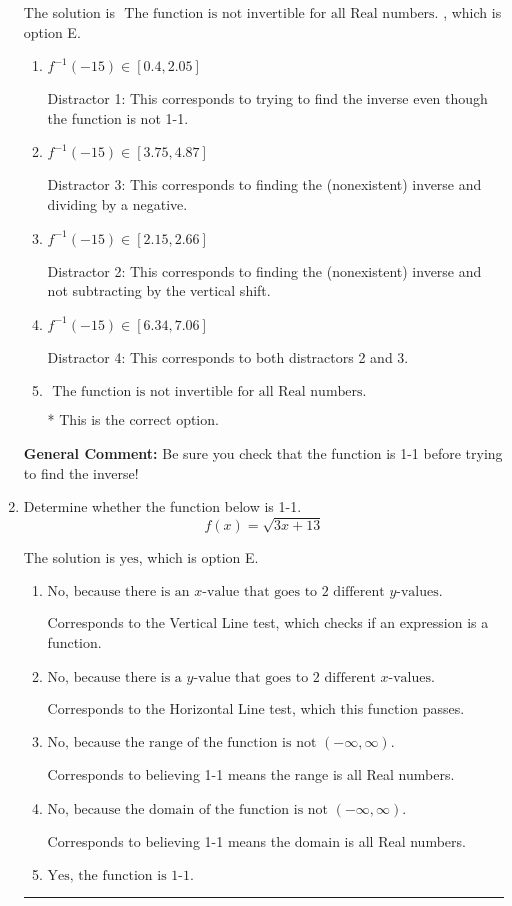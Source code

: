 \documentclass{extbook}[14pt]
\newcommand{\litem}[1]{\item #1

\rule{\textwidth}{0.4pt}}
\begin{document}
\begin{enumerate}
{The solution is \( \text{ The function is not invertible for all Real numbers. } \), which is option E.\begin{enumerate}[label=\Alph*.]
\item \( f^{-1}(-15) \in [0.4, 2.05] \)

 Distractor 1: This corresponds to trying to find the inverse even though the function is not 1-1. 
\item \( f^{-1}(-15) \in [3.75, 4.87] \)

 Distractor 3: This corresponds to finding the (nonexistent) inverse and dividing by a negative.
\item \( f^{-1}(-15) \in [2.15, 2.66] \)

 Distractor 2: This corresponds to finding the (nonexistent) inverse and not subtracting by the vertical shift.
\item \( f^{-1}(-15) \in [6.34, 7.06] \)

 Distractor 4: This corresponds to both distractors 2 and 3.
\item \( \text{ The function is not invertible for all Real numbers. } \)

* This is the correct option.
\end{enumerate}

\textbf{General Comment:} Be sure you check that the function is 1-1 before trying to find the inverse!
}
\litem{
Determine whether the function below is 1-1.
\[ f(x) = \sqrt{3 x + 13} \]

The solution is \( \text{yes} \), which is option E.\begin{enumerate}[label=\Alph*.]
\item \( \text{No, because there is an $x$-value that goes to 2 different $y$-values.} \)

Corresponds to the Vertical Line test, which checks if an expression is a function.
\item \( \text{No, because there is a $y$-value that goes to 2 different $x$-values.} \)

Corresponds to the Horizontal Line test, which this function passes.
\item \( \text{No, because the range of the function is not $(-\infty, \infty)$.} \)

Corresponds to believing 1-1 means the range is all Real numbers.
\item \( \text{No, because the domain of the function is not $(-\infty, \infty)$.} \)

Corresponds to believing 1-1 means the domain is all Real numbers.
\item \( \text{Yes, the function is 1-1.} \)


\end{enumerate}}
\end{enumerate}
\end{document}
